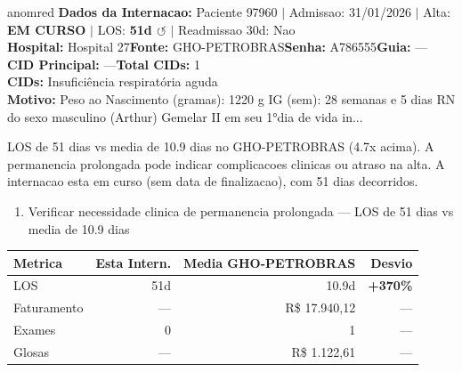 \documentclass[a4paper,10pt]{article}
\begin{document}
\begin{anomalycard}[Internacao 163846 | GHO-PETROBRAS | CRITICO (z=5.07)]{anomred}
\textbf{Dados da Internacao:} Paciente 97960 $\mid$ Admissao: 31/01/2026 $\mid$ Alta: \textcolor{anomorange}{\textbf{EM CURSO}} $\mid$ LOS: \textbf{51d \textcolor{anomorange}{$\circlearrowleft$}} $\mid$ Readmissao 30d: Nao\\
\textbf{Hospital:} Hospital 27\quad\textbf{Fonte:} GHO-PETROBRAS\quad\textbf{Senha:} A786555\quad\textbf{Guia:} ---\\
\textbf{CID Principal:} {\small ---}\quad\textbf{Total CIDs:} 1\\

\textbf{CIDs:} {\scriptsize Insuficiência respiratória aguda}\\

\textbf{Motivo:} {\scriptsize Peso ao Nascimento (gramas): 1220 g IG (sem): 28 semanas e 5 dias RN do sexo masculino (Arthur) Gemelar II em seu 1°dia de vida in...}\\

\vspace{2pt}\begin{tcolorbox}[colback=severityred!20,colframe=anomred,title={\textbf{Interpretacao de Negocio}},fonttitle=\bfseries\small,left=4pt,right=4pt,top=3pt,bottom=3pt]
{\small LOS de 51 dias vs media de 10.9 dias no GHO-PETROBRAS (4.7x acima). A permanencia prolongada pode indicar complicacoes clinicas ou atraso na alta. A internacao esta em curso (sem data de finalizacao), com 51 dias decorridos.}
\end{tcolorbox}
\begin{tcolorbox}[colback=severityyellow!30,colframe=anomorange,title={\textbf{Recomendacoes Especificas}},fonttitle=\bfseries\small,left=4pt,right=4pt,top=3pt,bottom=3pt]
\begin{enumerate}[nosep,leftmargin=16pt]
\item {\small Verificar necessidade clinica de permanencia prolongada --- LOS de 51 dias vs media de 10.9 dias}
\end{enumerate}
\end{tcolorbox}
\begin{center}\begin{tabular}{l r r r}\toprule\textbf{Metrica} & \textbf{Esta Intern.} & \textbf{Media GHO-PETROBRAS} & \textbf{Desvio} \\\midrule
LOS & 51d & 10.9d & \textcolor{anomred}{\textbf{+370\%}} \\
Faturamento & --- & R\$ 17.940,12 & --- \\
Exames & 0 & 1 & --- \\
Glosas & --- & R\$ 1.122,61 & --- \\
\bottomrule\end{tabular}\end{center}


\end{anomalycard}
\end{document}
